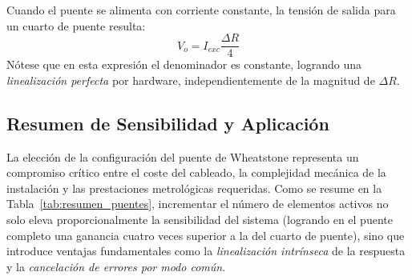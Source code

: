 \begin{marginfigure}
    \centering
    \shorthandoff{>}
    \caption[Puente Wheatstone alimentado por corriente.]{Puente Wheatstone alimentado por corriente. Al forzar la corriente, la caída de tensión en el sensor se vuelve lineal respecto a $\Delta R$.}\label{fig:puente_corriente}
\end{marginfigure}

Cuando el puente se alimenta con corriente constante, la tensión de salida para un cuarto de puente resulta:
\begin{equation}
    V_o = I_{exc} \frac{\Delta R}{4}
\end{equation}
Nótese que en esta expresión el denominador es constante, logrando una \emph{linealización perfecta} por hardware, independientemente de la magnitud de $\Delta R$.

\subsection{Resumen de Sensibilidad y Aplicación}

La elección de la configuración del puente de Wheatstone representa un compromiso crítico entre el coste del cableado, la complejidad mecánica de la instalación y las prestaciones metrológicas requeridas. Como se resume en la Tabla~\ref{tab:resumen_puentes}, incrementar el número de elementos activos no solo eleva proporcionalmente la sensibilidad del sistema (logrando en el puente completo una ganancia cuatro veces superior a la del cuarto de puente), sino que introduce ventajas fundamentales como la \emph{linealización intrínseca} de la respuesta y la \emph{cancelación de errores por modo común}. 

